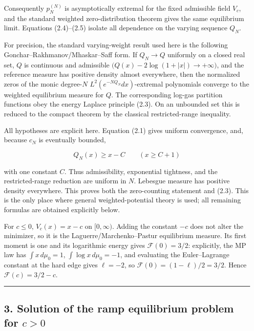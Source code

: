 Consequently \(p_N^{(N)}\) is asymptotically extremal for the fixed
admissible field \(V_c\), and the standard weighted zero-distribution
theorem gives the same equilibrium limit. Equations (2.4)--(2.5) isolate
all dependence on the varying sequence \(Q_N\).

For precision, the standard varying-weight result used here is the following
Gonchar--Rakhmanov/Mhaskar--Saff form. If \(Q_N\to Q\) uniformly on a closed
real set, \(Q\) is continuous and admissible
\(\bigl(Q(x)-2\log(1+|x|)\to+\infty\bigr)\), and the reference measure has
positive density almost everywhere, then the normalized zeros of the monic
degree-\(N\) \(L^2(e^{-NQ_N}dx)\)-extremal polynomials converge to the
weighted equilibrium measure for \(Q\). The corresponding log-gas partition
functions obey the energy Laplace principle (2.3). On an unbounded set this
is reduced to the compact theorem by the classical restricted-range
inequality.

All hypotheses are explicit here. Equation (2.1) gives uniform convergence,
and, because \(c_N\) is eventually bounded,

\[
Q_N(x)\ge x-C\qquad(x\ge C+1)
\]

with one constant \(C\). Thus admissibility, exponential tightness, and the
restricted-range reduction are uniform in \(N\). Lebesgue measure has
positive density everywhere. This proves both the zero-counting statement
and (2.3). This is the only place where general weighted-potential theory is
used; all remaining formulas are obtained explicitly below.

For \(c\le0\), \(V_c(x)=x-c\) on \([0,\infty)\). Adding the constant \(-c\)
does not alter the minimizer, so it is the Laguerre/Marchenko--Pastur
equilibrium measure. Its first moment is one and its logarithmic energy gives
\(\mathcal F(0)=3/2\): explicitly, the MP law has
\(\int x\,d\mu_0=1\), \(\int\log x\,d\mu_0=-1\), and evaluating the
Euler--Lagrange constant at the hard edge gives \(\ell=-2\), so
\(\mathcal F(0)=(1-\ell)/2=3/2\). Hence
\(\mathcal F(c)=3/2-c\).

\begin{center}\rule{0.5\linewidth}{0.5pt}\end{center}

\subsection{\texorpdfstring{3. Solution of the ramp equilibrium problem for \(c>0\)}{3. Solution of the ramp equilibrium problem for c\textgreater0}}

